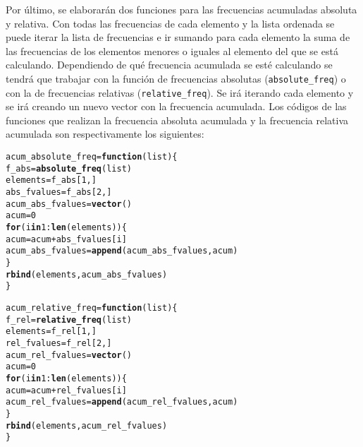 \documentclass[12pt]{report}\usepackage[]{graphicx}\usepackage[dvipsnames]{xcolor}
\makeatletter
\newcommand{\hlnum}[1]{\textcolor[rgb]{0.686,0.059,0.569}{#1}}%
\newcommand{\hlopt}[1]{\textcolor[rgb]{0,0,0}{#1}}%
\newcommand{\hlstd}[1]{\textcolor[rgb]{0.345,0.345,0.345}{#1}}%
\newcommand{\hlkwa}[1]{\textcolor[rgb]{0.161,0.373,0.58}{\textbf{#1}}}%
\newcommand{\hlkwb}[1]{\textcolor[rgb]{0.69,0.353,0.396}{#1}}%
\newcommand{\hlkwc}[1]{\textcolor[rgb]{0.333,0.667,0.333}{#1}}%
\newcommand{\hlkwd}[1]{\textcolor[rgb]{0.737,0.353,0.396}{\textbf{#1}}}%
\newenvironment{kframe}{%
 \def\at@end@of@kframe{}%
 \ifinner\ifhmode%
  \def\at@end@of@kframe{\end{minipage}}%
  \begin{minipage}{\columnwidth}%
 \fi\fi%
 \def\FrameCommand##1{\hskip\@totalleftmargin \hskip-\fboxsep
 \colorbox{shadecolor}{##1}\hskip-\fboxsep
     \hskip-\linewidth \hskip-\@totalleftmargin \hskip\columnwidth}%
 \MakeFramed {\advance\hsize-\width
   \@totalleftmargin\z@ \linewidth\hsize
   \@setminipage}}%
 {\par\unskip\endMakeFramed%
 \at@end@of@kframe}
\newenvironment{knitrout}{}{} %
\makeatother
\begin{document}
			Por último, se elaborarán dos funciones para las frecuencias acumuladas absoluta y relativa. Con todas las frecuencias de cada elemento y la lista ordenada se puede iterar la lista de frecuencias e ir sumando para cada elemento la suma de las frecuencias de los elementos menores o iguales al elemento del que se está calculando. Dependiendo de qué frecuencia acumulada se esté calculando se tendrá que trabajar con la función de frecuencias absolutas (\texttt{absolute\_freq}) o con la de frecuencias relativas (\texttt{relative\_freq}). Se irá iterando cada elemento y se irá creando un nuevo vector con la frecuencia acumulada. Los códigos de las funciones que realizan la frecuencia absoluta acumulada y la frecuencia relativa acumulada son respectivamente los siguientes:
			
\begin{knitrout}
\color{fgcolor}\begin{kframe}
\begin{alltt}
\hlstd{acum_absolute_freq} \hlkwb{=} \hlkwa{function}\hlstd{(}\hlkwc{list}\hlstd{) \{}
        \hlstd{f_abs} \hlkwb{=} \hlkwd{absolute_freq}\hlstd{(list)}
        \hlstd{elements} \hlkwb{=} \hlstd{f_abs[}\hlnum{1}\hlstd{,]}
        \hlstd{abs_fvalues} \hlkwb{=} \hlstd{f_abs[}\hlnum{2}\hlstd{,]}
        \hlstd{acum_abs_fvalues} \hlkwb{=} \hlkwd{vector}\hlstd{()}
        \hlstd{acum} \hlkwb{=} \hlnum{0}
        \hlkwa{for} \hlstd{(i} \hlkwa{in} \hlnum{1}\hlopt{:}\hlkwd{len}\hlstd{(elements)) \{}
                \hlstd{acum} \hlkwb{=} \hlstd{acum} \hlopt{+} \hlstd{abs_fvalues[i]}
                \hlstd{acum_abs_fvalues} \hlkwb{=} \hlkwd{append}\hlstd{(acum_abs_fvalues, acum)}
        \hlstd{\}}
        \hlkwd{rbind}\hlstd{(elements, acum_abs_fvalues)}
\hlstd{\}}

\hlstd{acum_relative_freq} \hlkwb{=} \hlkwa{function}\hlstd{(}\hlkwc{list}\hlstd{) \{}
        \hlstd{f_rel} \hlkwb{=} \hlkwd{relative_freq}\hlstd{(list)}
        \hlstd{elements} \hlkwb{=} \hlstd{f_rel[}\hlnum{1}\hlstd{,]}
        \hlstd{rel_fvalues} \hlkwb{=} \hlstd{f_rel[}\hlnum{2}\hlstd{,]}
        \hlstd{acum_rel_fvalues} \hlkwb{=} \hlkwd{vector}\hlstd{()}
        \hlstd{acum} \hlkwb{=} \hlnum{0}
        \hlkwa{for} \hlstd{(i} \hlkwa{in} \hlnum{1}\hlopt{:}\hlkwd{len}\hlstd{(elements)) \{}
                \hlstd{acum} \hlkwb{=} \hlstd{acum} \hlopt{+} \hlstd{rel_fvalues[i]}
                \hlstd{acum_rel_fvalues} \hlkwb{=} \hlkwd{append}\hlstd{(acum_rel_fvalues, acum)}
        \hlstd{\}}
        \hlkwd{rbind}\hlstd{(elements, acum_rel_fvalues)}
\hlstd{\}}
\end{alltt}
\end{kframe}
\end{knitrout}
			
\end{document}
